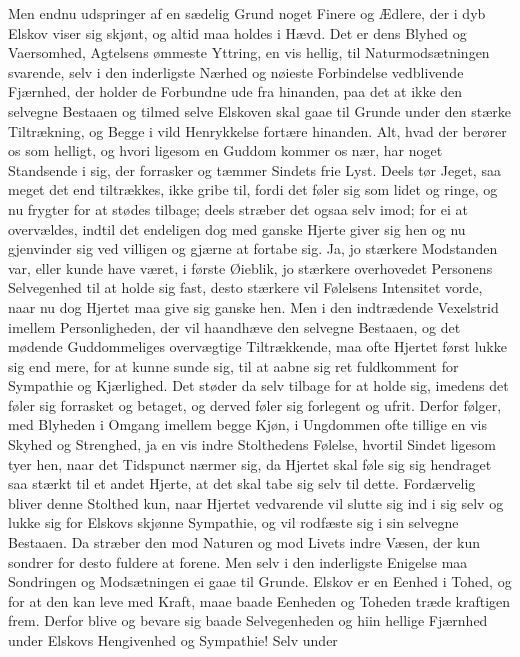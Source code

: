 \documentclass[12pt,a4paper]{book}
\newcommand{\apage}[1]{\marginnote{\footnotesize\textit{[#1]}}}
\begin{document}
Men endnu udspringer af en sædelig Grund noget Finere og Ædlere, der i
dyb Elskov viser sig skjønt, og altid maa holdes i Hævd. Det er dens
Blyhed og Vaersomhed, Agtelsens ømmeste Yttring, en vis hellig, til
Naturmodsætningen svarende, selv i den inderligste Nærhed og nøieste
Forbindelse vedblivende Fjærnhed, der holder de Forbundne ude fra
hinanden, paa det at ikke den selvegne Bestaaen og tilmed selve Elskoven
skal gaae til Grunde under den stærke Tiltrækning, og Begge i vild
Henrykkelse fortære hinanden. Alt, hvad der berører os som helligt, og
hvori ligesom en Guddom kommer os nær, har noget Standsende i sig, der
forrasker og tæmmer Sindets frie Lyst. Deels tør Jeget, saa meget det
end tiltrækkes, ikke gribe til, fordi det føler sig som lidet og ringe,
og nu frygter for at stødes tilbage; deels stræber det ogsaa selv imod;
for ei at overvældes, indtil det endeligen dog med ganske Hjerte giver
sig hen og nu gjenvinder sig ved villigen og gjærne at fortabe sig. Ja,
jo stærkere Modstanden \apage{48} var, eller kunde have været, i første Øieblik, jo
stærkere overhovedet Personens Selvegenhed til at holde sig fast, desto
stærkere vil Følelsens Intensitet vorde, naar nu dog Hjertet maa give
sig ganske hen. Men i den indtrædende Vexelstrid imellem Personligheden,
der vil haandhæve den selvegne Bestaaen, og det mødende Guddommeliges
overvægtige Tiltrækkende, maa ofte Hjertet først lukke sig end mere, for
at kunne sunde sig, til at aabne sig ret fuldkomment for Sympathie og
Kjærlighed. Det støder da selv tilbage for at holde sig, imedens det
føler sig forrasket og betaget, og derved føler sig forlegent og ufrit.
Derfor følger, med Blyheden i Omgang imellem begge Kjøn, i Ungdommen
ofte tillige en vis Skyhed og Strenghed, ja en vis indre Stolthedens
Følelse, hvortil Sindet ligesom tyer hen, naar det Tidspunct nærmer sig,
da Hjertet skal føle sig sig hendraget saa stærkt til et andet Hjerte,
at det skal tabe sig selv til dette. Fordærvelig bliver denne Stolthed
kun, naar Hjertet vedvarende vil slutte sig ind i sig selv og lukke sig
for Elskovs skjønne Sympathie, og vil rodfæste sig i sin selvegne
Bestaaen. Da stræber den mod Naturen og mod Livets indre Væsen, der kun
sondrer for desto fuldere at forene. Men selv i den inderligste Enigelse
maa Sondringen og Modsætningen ei gaae til Grunde. Elskov er en Eenhed i
Tohed, og for at den kan leve med Kraft, maae baade Eenheden og Toheden
træde kraftigen frem. Derfor blive og bevare sig baade Selvegenheden og
hiin \apage{49} hellige Fjærnhed under Elskovs Hengivenhed og Sympathie! Selv under
\end{document}
